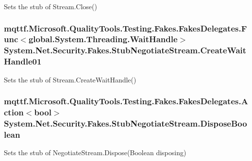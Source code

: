 Sets the stub of Stream.\-Close()

\hypertarget{class_system_1_1_net_1_1_security_1_1_fakes_1_1_stub_negotiate_stream_a06a01a60f2c3f2edb6f3bde17c061f60}{
\subsubsection[{Create\-Wait\-Handle01}]{\setlength{\rightskip}{0pt plus 5cm}mqttf.\-Microsoft.\-Quality\-Tools.\-Testing.\-Fakes.\-Fakes\-Delegates.\-Func$<$global.\-System.\-Threading.\-Wait\-Handle$>$ System.\-Net.\-Security.\-Fakes.\-Stub\-Negotiate\-Stream.\-Create\-Wait\-Handle01}}\label{class_system_1_1_net_1_1_security_1_1_fakes_1_1_stub_negotiate_stream_a06a01a60f2c3f2edb6f3bde17c061f60}


Sets the stub of Stream.\-Create\-Wait\-Handle()

\hypertarget{class_system_1_1_net_1_1_security_1_1_fakes_1_1_stub_negotiate_stream_af6eea24d04abfe0df6f3249e8b44c98e}{
\subsubsection[{Dispose\-Boolean}]{\setlength{\rightskip}{0pt plus 5cm}mqttf.\-Microsoft.\-Quality\-Tools.\-Testing.\-Fakes.\-Fakes\-Delegates.\-Action$<$bool$>$ System.\-Net.\-Security.\-Fakes.\-Stub\-Negotiate\-Stream.\-Dispose\-Boolean}}\label{class_system_1_1_net_1_1_security_1_1_fakes_1_1_stub_negotiate_stream_af6eea24d04abfe0df6f3249e8b44c98e}


Sets the stub of Negotiate\-Stream.\-Dispose(\-Boolean disposing)

